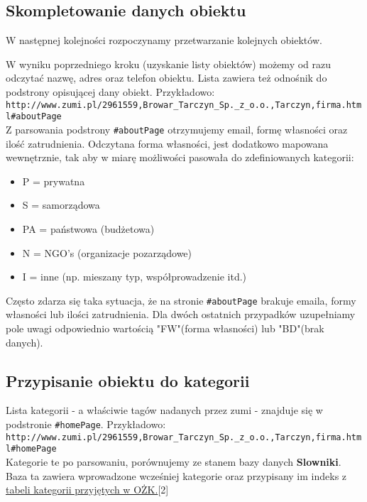 \documentclass[a4 122pt]{article}
\begin{document}
			
		\subsection{Skompletowanie danych obiektu}
		
			W następnej kolejności rozpoczynamy przetwarzanie kolejnych obiektów.
			
			W wyniku poprzedniego kroku (uzyskanie listy obiektów) możemy od razu odczytać nazwę, adres oraz telefon obiektu.
			Lista zawiera też odnośnik do podstrony opisującej dany obiekt. Przykładowo:\\
			
			\texttt{http://www.zumi.pl/2961559,Browar\_Tarczyn\_Sp.\_z\_o.o.,Tarczyn,firma.html\#aboutPage}\\
			
			Z parsowania podstrony \texttt{\#aboutPage} otrzymujemy email, formę własności oraz ilość zatrudnienia. 
			Odczytana forma własności, jest dodatkowo mapowana wewnętrznie, tak aby w miarę możliwości pasowała do zdefiniowanych kategorii:
					\begin{itemize}
						\item P = prywatna
						\item S = samorządowa
						\item PA = państwowa (budżetowa)
						\item N = NGO's (organizacje pozarządowe)
						\item I = inne (np. mieszany typ, współprowadzenie itd.)
					\end{itemize}
			
			\noindent Często zdarza się taka sytuacja, że na stronie \texttt{\#aboutPage} brakuje emaila, formy własności lub ilości zatrudnienia.
			Dla dwóch ostatnich przypadków uzupełniamy pole uwagi odpowiednio wartością "FW"(forma własności) lub "BD"(brak danych).  
		
		\subsection{Przypisanie obiektu do kategorii}
	
			Lista kategorii - a właściwie tagów nadanych przez zumi - znajduje się w podstronie \texttt{\#homePage}. Przykładowo: \\
	
			\texttt{http://www.zumi.pl/2961559,Browar\_Tarczyn\_Sp.\_z\_o.o.,Tarczyn,firma.html\#homePage}\\
			
			Kategorie te po parsowaniu, porównujemy ze stanem bazy danych \textbf{Slowniki}.
			Baza ta zawiera wprowadzone wcześniej kategorie oraz przypisany im indeks z \href{http://ozkultura.pl/node/1800}{tabeli kategorii przyjętych w OŻK.}[2]
\end{document}
